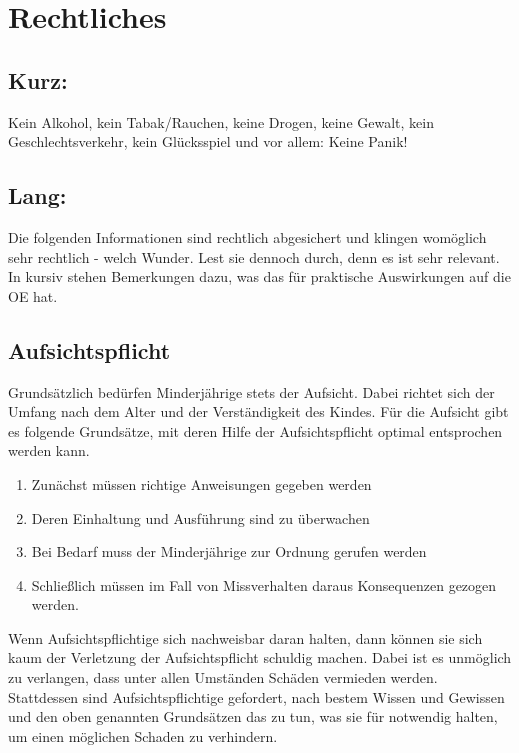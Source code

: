 \documentclass[a4paper,11pt]{scrartcl} %
\begin{document}
\section{Rechtliches}		
		
	\subsection*{Kurz:}

Kein Alkohol, kein Tabak/Rauchen, keine Drogen, keine Gewalt, kein Geschlechtsverkehr, kein Glücksspiel und vor allem: Keine Panik!

		\subsection*{Lang:}
		
Die folgenden Informationen sind rechtlich abgesichert und klingen womöglich sehr rechtlich - welch Wunder. Lest sie dennoch durch, denn es ist sehr relevant. In kursiv stehen Bemerkungen dazu, was das für praktische Auswirkungen auf die OE hat.

\subsection{Aufsichtspflicht}

Grundsätzlich bedürfen Minderjährige stets der Aufsicht. Dabei richtet sich der Umfang nach dem Alter und der Verständigkeit des Kindes. Für die Aufsicht gibt es folgende Grundsätze, mit deren Hilfe der Aufsichtspflicht optimal entsprochen werden kann.

\begin{enumerate}
	\item Zunächst müssen richtige Anweisungen gegeben werden
	\item Deren Einhaltung und Ausführung sind zu überwachen
	\item Bei Bedarf muss der Minderjährige zur Ordnung gerufen werden
	\item Schließlich müssen im Fall von Missverhalten daraus Konsequenzen gezogen werden.
\end{enumerate}

Wenn Aufsichtspflichtige sich nachweisbar daran halten, dann können sie sich kaum der Verletzung der Aufsichtspflicht schuldig machen. Dabei ist es unmöglich zu verlangen, dass unter allen Umständen Schäden vermieden werden. Stattdessen sind Aufsichtspflichtige gefordert, nach bestem Wissen und Gewissen und den oben genannten Grundsätzen das zu tun, was sie für notwendig halten, um einen möglichen Schaden zu verhindern.
\end{document}
